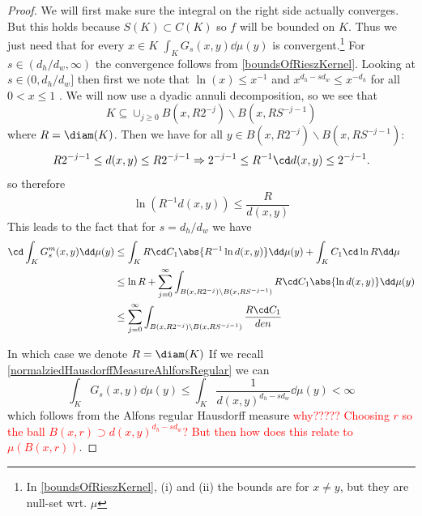 \begin{proof}
	We will first make sure the integral on the right side actually converges. But this holds because $S(K) \subset C(K)$ so $f$ will be bounded on $K$. Thus we just need that for every $x \in K$ $\int_{K}G_s(x,y) \dd \mu(y)$ is convergent.\footnote{In \cref{boundsOfRieszKernel}, (i) and (ii) the bounds are for $x \neq y$, but they are null-set wrt. $\mu$}  For $s \in (d_h/d_w, \infty)$ the convergence follows from \cref{boundsOfRieszKernel}. Looking at $s \in (0, d_h/d_w]$ then first we note that $\ln(x) \leq x^{-1}$ and $x^{d_h-sd_w} \leq x^{-d_h}$ for all $0 < x \leq 1$ . We will now use a dyadic annuli decomposition, so we see that 
	$$K \subseteq \cup_{j \geq 0} B(x, R2^{-j})\backslash B(x,RS^{-j-1})$$ 
	where $R = \diam(K)$. Then we have for all $y \in B(x, R2^{-j})\backslash B(x,RS^{-j-1})$:
	$$R2^{-j-1} \leq d(x,y) \leq R2^{-j-1} \Rightarrow 2^{-j-1} \leq R^{-1} \cd d(x,y) \leq 2^{-j-1} .$$ 
	so therefore
	\begin{equation}
		\ln(R^{-1} d(x,y)) \leq \frac{R}{d(x,y)} 
	\end{equation}
	This leads to the fact that for $s = d_h/d_w$ we have
	\begin{align}
		\cd \int_{K} G_s^{m}(x,y) \dd \mu(y) &\leq \int_{K} R \cd C_1 \abs{R^{-1} \ln d(x,y)} \dd \mu(y) + \int_{K} C_1 \cd \ln R \dd \mu\\
		& \leq \ln R + \sum_{j = 0}^{\infty} \int_{B(x, R2^{-j})\backslash B(x,RS^{-j-1})} R \cd C_1 \abs{\ln d(x,y)} \dd \mu(y) \\
		&\leq \sum_{j = 0}^{\infty} \int_{B(x, R2^{-j})\backslash B(x,RS^{-j-1})} \frac{R \cd C_1}{den}
	\end{align}
	
	In which case we denote $R = \diam(K)$ If we recall \cref{normalziedHausdorffMeasureAhlforsRegular} we can
	\begin{equation}
		\int_{K}G_s(x,y)\dd \mu (y) \leq \int_{K}\frac{1}{d(x,y)^{d_h-sd_w}}  \dd \mu (y) < \infty
	\end{equation}
	which follows from the Alfons regular Hausdorff measure \textcolor{red}{why????? Choosing $r$ so the ball $B(x,r) \supset d(x,y)^{d_h-sd_w}$? But then how does this relate to $\mu(B(x,r))$}.
	

\end{proof}
